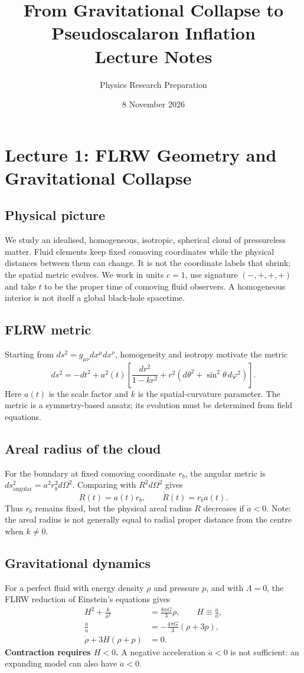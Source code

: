 \documentclass[11pt,a4paper]{article}
\title{From Gravitational Collapse to Pseudoscalaron Inflation\\Lecture Notes}
\author{Physics Research Preparation}
\date{8 November 2026}
\begin{document}
\maketitle
\tableofcontents
\section{Lecture 1: FLRW Geometry and Gravitational Collapse}
\subsection{Physical picture}
We study an idealised, homogeneous, isotropic, spherical cloud of pressureless matter. Fluid elements keep fixed comoving coordinates while the physical distances between them can change. It is not the coordinate labels that shrink; the spatial metric evolves. We work in units $c=1$, use signature $(-,+,+,+)$ and take $t$ to be the proper time of comoving fluid observers. A homogeneous interior is not itself a global black-hole spacetime.
\subsection{FLRW metric}
Starting from $ds^2=g_{\mu\nu}dx^\mu dx^\nu$, homogeneity and isotropy motivate the metric
\begin{equation}
ds^2=-dt^2+a^2(t)\left[\frac{dr^2}{1-kr^2}+r^2(d\theta^2+\sin^2\theta\,d\varphi^2)\right].
\end{equation}
Here $a(t)$ is the scale factor and $k$ is the spatial-curvature parameter. The metric is a symmetry-based ansatz; its evolution must be determined from field equations.
\subsection{Areal radius of the cloud}
For the boundary at fixed comoving coordinate $r_b$, the angular metric is $ds^2_{\mathrm{angular}}=a^2r_b^2d\Omega^2$. Comparing with $R^2d\Omega^2$ gives
\begin{equation}
\boxed{R(t)=a(t)r_b},\qquad \boxed{\dot R(t)=r_b\dot a(t)}.
\end{equation}
Thus $r_b$ remains fixed, but the physical areal radius $R$ decreases if $\dot a<0$. Note: the areal radius is not generally equal to radial proper distance from the centre when $k\neq0$.
\subsection{Gravitational dynamics}
For a perfect fluid with energy density $\rho$ and pressure $p$, and with $\Lambda=0$, the FLRW reduction of Einstein's equations gives
\begin{align}
H^2+\frac{k}{a^2}&=\frac{8\pi G}{3}\rho,\qquad H\equiv\frac{\dot a}{a},\\
\frac{\ddot a}{a}&=-\frac{4\pi G}{3}(\rho+3p),\\
\dot\rho+3H(\rho+p)&=0.
\end{align}
\textbf{Contraction requires $H<0$.} A negative acceleration $\ddot a<0$ is not sufficient: an expanding model can also have $\ddot a<0$.
\end{document}
